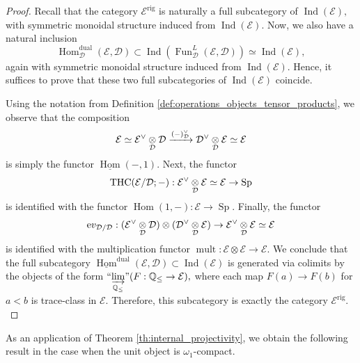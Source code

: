 \documentclass[11pt,leqno]{amsart}
\numberwithin{equation}{section}
\def\Q{\mathbb{Q}}
\def\Hom{\operatorname{Hom}}
\newcommand{\tens}[1]{%
  \mathbin{\mathop{\otimes}\displaylimits_{#1}}%
}
\newcommand{\indlim}[1][]{\mathop{\varinjlim}\limits_{#1}}
\newcommand{\inddlim}[1][]{{``{\indlim[#1]}"}}
\newcommand{\xto}{\xrightarrow}
\newcommand{\rig}{\operatorname{rig}}
\newcommand{\dual}{\operatorname{dual}}
\newcommand{\ev}{\mathrm ev}
\newcommand{\cD}{{\mathcal D}}
\newcommand{\cE}{{\mathcal E}}
\newcommand{\un}{\underline}
\newcommand{\THC}{\operatorname{THC}}
\newcommand{\Fun}{\operatorname{Fun}}
\newcommand{\Sp}{\operatorname{Sp}}
\newcommand{\Ind}{\operatorname{Ind}}
\newcommand{\mult}{\operatorname{mult}}
\begin{document}
\begin{proof}
Recall that the category $\cE^{\rig}$ is naturally a full subcategory of $\Ind(\cE),$ with symmetric monoidal structure induced from $\Ind(\cE).$ Now, we also have a natural inclusion
\begin{equation*}
\Hom_{\cD}^{\dual}(\cE,\cD)\subset \Ind(\Fun_{\cD}^L(\cE,\cD))\simeq \Ind(\cE),
\end{equation*} 
again with symmetric monoidal structure induced from $\Ind(\cE).$ Hence, it suffices to prove that these two full subcategories of $\Ind(\cE)$ coincide.

Using the notation from Definition \ref{def:operations_objects_tensor_products}, we observe that the composition
\begin{equation*}
\cE\simeq \cE^{\vee}\tens{\cD}\cD\xto{(-)_{\cD}^{\vee}}\cD^{\vee}\tens{\cD}\cE\simeq \cE
\end{equation*}
is simply the functor $\un{\Hom}(-,1).$ Next, the functor
$$\THC(\cE/\cD;-):\cE^{\vee}\tens{\cD}\cE\simeq\cE\to\Sp$$ is identified with the functor $\Hom(1,-):\cE\to\Sp.$ Finally, the functor
$$\ev_{\cD/\cD}:(\cE^{\vee}\tens{\cD}\cD)\otimes(\cD^{\vee}\tens{\cD}\cE)\to\cE^{\vee}\tens{\cD}\cE\simeq \cE$$
is identified with the multiplication functor $\mult:\cE\otimes\cE\to\cE.$ We conclude that the full subcategory $\un{\Hom}^{\dual}(\cE,\cD)\subset\Ind(\cE)$ is generated via colimits by the objects of the form $\inddlim[\Q_{\leq}](F:\Q_{\leq}\to \cE),$ where each map $F(a)\to F(b)$ for $a<b$ is trace-class in $\cE.$ Therefore, this subcategory is exactly the category $\cE^{\rig}.$
\end{proof}

As an application of Theorem \ref{th:internal_projectivity}, we obtain the following result in the case when the unit object is $\omega_1$-compact.
\end{document}
